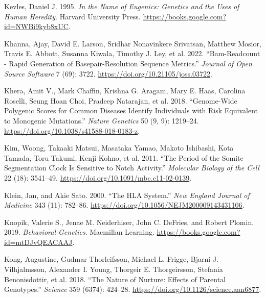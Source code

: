 \documentclass[
]{book}
\newlength{\cslhangindent}
\newlength{\cslentryspacingunit} %
\newenvironment{CSLReferences}[2] %
 {%
  \setlength{\parindent}{0pt}
  \ifodd #1
  \let\oldpar\par
  \def\par{\hangindent=\cslhangindent\oldpar}
  \fi
  \setlength{\parskip}{#2\cslentryspacingunit}
 }%
 {}
\begin{document}
\begin{CSLReferences}{1}{0}
\leavevmode{}%
Kevles, Daniel J. 1995. \emph{In the {Name} of {Eugenics}: {Genetics} and the {Uses} of {Human Heredity}}. {Harvard University Press}. \url{https://books.google.com?id=NWBi9kyb8xUC}.

\leavevmode{}%
Khanna, Ajay, David E. Larson, Sridhar Nonavinkere Srivatsan, Matthew Mosior, Travis E. Abbott, Susanna Kiwala, Timothy J. Ley, et al. 2022. {``Bam-Readcount - Rapid Generation of Basepair-Resolution Sequence Metrics.''} \emph{Journal of Open Source Software} 7 (69): 3722. \url{https://doi.org/10.21105/joss.03722}.

\leavevmode{}%
Khera, Amit V., Mark Chaffin, Krishna G. Aragam, Mary E. Haas, Carolina Roselli, Seung Hoan Choi, Pradeep Natarajan, et al. 2018. {``Genome-Wide Polygenic Scores for Common Diseases Identify Individuals with Risk Equivalent to Monogenic Mutations.''} \emph{Nature Genetics} 50 (9, 9): 1219--24. \url{https://doi.org/10.1038/s41588-018-0183-z}.

\leavevmode{}%
Kim, Woong, Takaaki Matsui, Masataka Yamao, Makoto Ishibashi, Kota Tamada, Toru Takumi, Kenji Kohno, et al. 2011. {``The Period of the Somite Segmentation Clock Is Sensitive to {Notch} Activity.''} \emph{Molecular Biology of the Cell} 22 (18): 3541--49. \url{https://doi.org/10.1091/mbc.e11-02-0139}.

\leavevmode{}%
Klein, Jan, and Akie Sato. 2000. {``The {HLA System}.''} \emph{New England Journal of Medicine} 343 (11): 782--86. \url{https://doi.org/10.1056/NEJM200009143431106}.

\leavevmode{}%
Knopik, Valerie S., Jenae M. Neiderhiser, John C. DeFries, and Robert Plomin. 2019. \emph{Behavioral {Genetics}}. {Macmillan Learning}. \url{https://books.google.com?id=mtDJvQEACAAJ}.

\leavevmode{}%
Kong, Augustine, Gudmar Thorleifsson, Michael L. Frigge, Bjarni J. Vilhjalmsson, Alexander I. Young, Thorgeir E. Thorgeirsson, Stefania Benonisdottir, et al. 2018. {``The Nature of Nurture: {Effects} of Parental Genotypes.''} \emph{Science} 359 (6374): 424--28. \url{https://doi.org/10.1126/science.aan6877}.


\end{CSLReferences}
\end{document}
